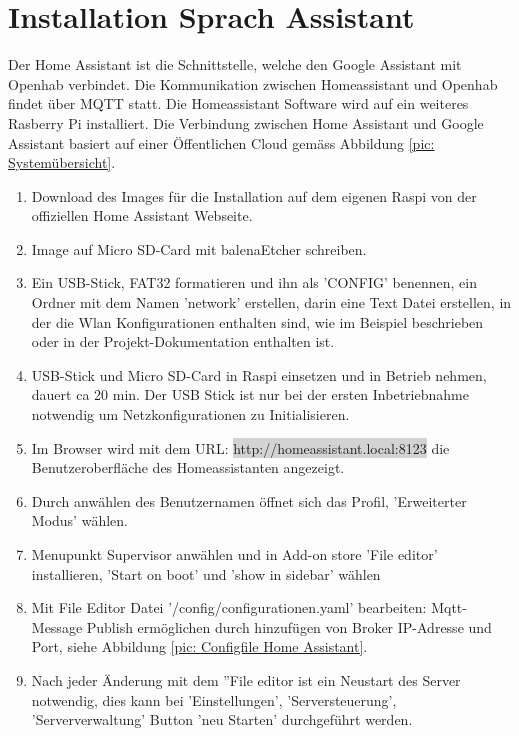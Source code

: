 \clearpage
\section{Installation Sprach Assistant} \label{sec:Assistant}
Der Home Assistant ist die Schnittstelle, welche den Google Assistant mit Openhab verbindet. Die Kommunikation zwischen Homeassistant und Openhab findet über MQTT statt. Die Homeassistant Software wird auf ein weiteres Rasberry Pi installiert. Die Verbindung zwischen Home Assistant und Google Assistant basiert auf einer Öffentlichen Cloud gemäss Abbildung \ref{pic: Systemübersicht}.

\begin{enumerate}
	\item Download des Images für die Installation auf dem eigenen Raspi von der offiziellen Home Assistant \cite{assistant_installing_nodate} Webseite.
\item Image auf Micro SD-Card mit balenaEtcher \cite{noauthor_balenaetcher_nodate} schreiben. 
\item Ein USB-Stick, FAT32 formatieren und ihn als 'CONFIG' benennen, ein Ordner mit dem Namen 'network' erstellen, darin eine Text Datei erstellen, in der die Wlan Konfigurationen enthalten sind, wie im Beispiel \cite{noauthor_home-assistantoperating-system_nodate} beschrieben oder in der Projekt-Dokumentation enthalten ist.
\item USB-Stick und Micro SD-Card in Raspi einsetzen und in Betrieb nehmen, dauert ca 20 min. Der USB Stick ist nur bei der ersten Inbetriebnahme notwendig um Netzkonfigurationen zu Initialisieren.
\item Im Browser wird mit dem URL: \colorbox{lightgray}{http://homeassistant.local:8123} die Benutzeroberfläche des Homeassistanten angezeigt. 
\item Durch anwählen des Benutzernamen öffnet sich das Profil, 'Erweiterter Modus' wählen.
\item Menupunkt Supervisor anwählen und in Add-on store 'File editor' installieren, 'Start on boot' und 'show in sidebar' wählen
\item Mit File Editor Datei '/config/configurationen.yaml' bearbeiten: Mqtt-Message Publish ermöglichen durch hinzufügen von Broker IP-Adresse und Port, siehe Abbildung \ref{pic: Configfile Home Assistant}.
\item Nach jeder Änderung mit dem ''File editor ist ein Neustart des Server notwendig, dies kann bei 'Einstellungen', 'Serversteuerung', 'Serververwaltung' Button 'neu Starten' durchgeführt werden.

\end{enumerate}
